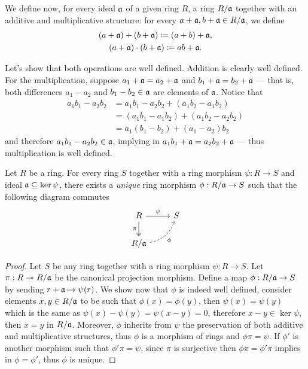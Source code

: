 We define now, for every ideal \(\mathfrak{a}\) of a given ring \(R\), a ring
\(R/\mathfrak{a}\) together with an additive and multiplicative structure: for
every \(a + \mathfrak{a}, b + \mathfrak{a} \in R/\mathfrak{a}\), we define
\begin{gather*}
(a + \mathfrak{a}) + (b + \mathfrak{a}) \coloneq (a + b) + \mathfrak{a}, \\
(a + \mathfrak{a}) \cdot (b + \mathfrak{a}) \coloneq a b + \mathfrak{a}.
\end{gather*}

Let's show that both operations are well defined. Addition is clearly well
defined. For the multiplication, suppose \(a_1 + \mathfrak{a} = a_2 + \mathfrak{a}\)
and \(b_1 + \mathfrak{a} = b_2 + \mathfrak{a}\) --- that is, both differences
\(a_1 - a_2\) and \(b_1 - b_2 \in \mathfrak{a}\) are elements of
\(\mathfrak{a}\). Notice that
\begin{align*}
a_1 b_1 - a_2 b_2
&= a_1 b_1 - a_2 b_2 + (a_1 b_2 - a_1 b_2) \\
&= (a_1 b_1 - a_1 b_2) + (a_1 b_2 - a_2 b_2) \\
&= a_1 (b_1 - b_2) + (a_1 - a_2) b_2
\end{align*}
and therefore \(a_1 b_1 - a_2 b_2 \in \mathfrak{a}\), implying in
\(a_1 b_1 + \mathfrak{a} = a_2 b_2 + \mathfrak{a}\) --- thus multiplication is well
defined.

\begin{proposition}
\label{prop:universal-property-quotienting-rings}
Let \(R\) be a ring. For every ring \(S\) together with a ring morphism \(\psi:
R \to S\) and ideal \(\mathfrak{a} \subseteq \ker \psi\), there exists a
\emph{unique} ring morphism \(\phi: R/\mathfrak{a} \to S\) such that the
following diagram commutes
\[
\begin{tikzcd}
R \ar[r, "\psi"] \ar[d, swap, "\pi", two heads] &S \\
R/\ideal{a} \ar[ru, bend right, swap, "\phi", dashed] &
\end{tikzcd}
\]
\end{proposition}

\begin{proof}
Let \(S\) be any ring together with a ring morphism \(\psi: R \to S\). Let
\(\pi: R \twoheadrightarrow R/\mathfrak{a}\) be the canonical projection morphism. Define a map
\(\phi: R/\mathfrak{a} \to S\) by sending \(r + \mathfrak{a} \mapsto \psi(r)\). We
show now that \(\phi\) is indeed well defined, consider elements
\(x, y \in R/\mathfrak{a}\) to be such that \(\phi(x) = \phi(y)\), then
\(\psi(x) = \psi(y)\) which is the same as
\(\psi(x) - \psi(y) = \psi(x - y) = 0\), therefore \(x - y \in \ker \psi\), then
\(x = y\) in \(R/\mathfrak{a}\). Moreover, \(\phi\) inherits from \(\psi\) the
preservation of both additive and multiplicative structures, thus \(\phi\) is a
morphism of rings and \(\phi \pi = \psi\). If \(\phi'\) is another morphism such
that \(\phi' \pi = \psi\), since \(\pi\) is surjective then \(\phi \pi = \phi'
\pi\) implies in \(\phi = \phi'\), thus \(\phi\) is unique.
\end{proof}

